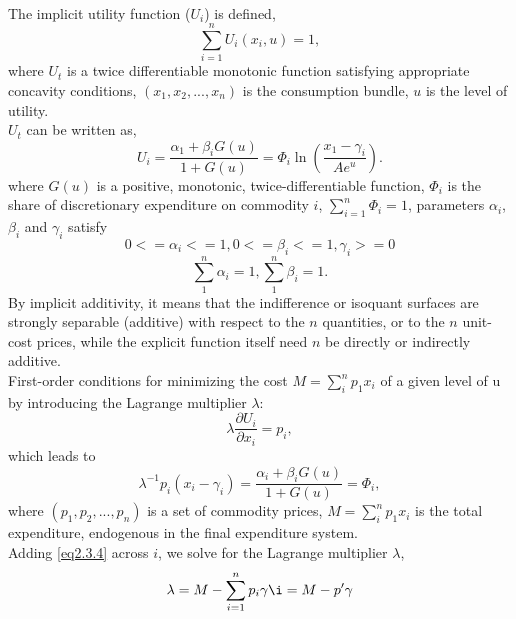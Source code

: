 \paragraph{}{The implicit utility function ($U_i$) is defined, 
	\begin{equation}\label{eq2.3.1}
		\sum_{i=1}^{n} U_i(x_i, u)=1,
	\end{equation}
where $U_t$ is a twice differentiable monotonic function satisfying appropriate concavity conditions, ${(x_1, x_2,..., x_n)}$ is the consumption bundle, $u$ is the level of utility.\\
$U_t$ can be written as,
	\begin{equation}\label{eq2.3.2}
		U_i=\frac{\alpha_1+\beta_i G(u)}{1+G(u)}=\Phi_i\ln(\frac{x_1-\gamma_i}{Ae^u}).
	\end{equation}
where $G(u)$ is a positive, monotonic, twice-differentiable function, $\Phi_i$ is the share of discretionary expenditure on commodity $i$, $\sum_{i=1}^{n}\Phi_i=1$, parameters $\alpha_i$, $\beta_i$ and $\gamma_i$ satisfy
	\begin{equation}
		0 <= \alpha_i <= 1, 0<= \beta_i <= 1, \gamma_i >= 0
	\end{equation}
	\begin{equation}
		\sum_{1}^{n} \alpha_i=1, \sum_{1}^{n} \beta_i=1.
	\end{equation}
By implicit additivity, it means that the indifference or isoquant surfaces are strongly separable (additive) with respect to the $n$ quantities, or to the $n$ unit-cost prices, while the explicit function itself need $n$ be directly or indirectly additive. \\
First-order conditions for minimizing the cost $M=\sum_{i}^{n} p_1 x_i$ of a given level of u by introducing the Lagrange multiplier $\lambda$:
	\begin{equation}\label{eq2.3.3}
		\lambda \frac{\partial U_i}{\partial x_i} = p_i,
	\end{equation}
which leads to 
	\begin{equation}\label{eq2.3.4}
		\lambda^{-1}p_i(x_i-\gamma_i)=\frac{\alpha_i +\beta_i G(u)}{1+G(u)}=\Phi_i,
	\end{equation}
where ${(p_1, p_2, ..., p_n)}$ is a set of commodity prices, $M=\sum_{i}^{n} p_1 x_i$ is the total expenditure, endogenous in the final expenditure system. \\
Adding \cref{eq2.3.4} across $i$, we solve for the Lagrange multiplier $\lambda$,
	\begin{equation}
		\lambda = M-\sum_{i=1}^{n} p_i \gamma\i = M-p'\gamma
	\end{equation}

}


